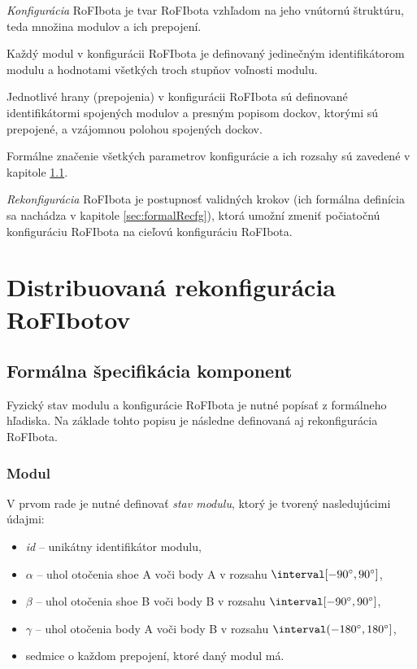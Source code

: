 \documentclass[
  digital, %
  oneside, %
  table,   %
  lof,     %
  nolot,     %
]{fithesis3}
\begin{document}
\textit{Konfigurácia} RoFIbota je tvar RoFIbota vzhľadom na jeho vnútornú štruktúru, teda množina modulov a ich prepojení. 

Každý modul v konfigurácii RoFIbota je definovaný jedinečným identifikátorom modulu a hodnotami všetkých troch stupňov voľnosti modulu. 

Jednotlivé hrany (prepojenia) v konfigurácii RoFIbota sú definované identifikátormi spojených modulov a presným popisom dockov, ktorými sú prepojené, a vzájomnou polohou spojených dockov. 

Formálne značenie všetkých parametrov konfigurácie a ich rozsahy sú zavedené v kapitole \ref{sec:formalSpec}. 

\textit{Rekonfigurácia} RoFIbota je postupnosť validných krokov (ich formálna definícia sa nachádza v kapitole \ref{sec:formalRecfg}), ktorá umožní zmeniť počiatočnú konfiguráciu RoFIbota na cieľovú konfiguráciu RoFIbota. 






\chapter{Distribuovaná rekonfigurácia RoFIbotov}
\section{Formálna špecifikácia komponent}
\label{sec:formalSpec}
Fyzický stav modulu a konfigurácie RoFIbota je nutné popísať z formálneho hľadiska. Na základe tohto popisu je následne definovaná aj rekonfigurácia RoFIbota. 

\subsection{Modul}
\label{sec:formalSpecModul}
V prvom rade je nutné definovať \textit{stav modulu}, ktorý je tvorený nasledujúcimi údajmi: 
\begin{itemize}
    \item \textit{id} -- unikátny identifikátor modulu, 
    \item $\alpha$ -- uhol otočenia shoe A voči body A v rozsahu $\interval[{-90\degree, 90\degree}]$,
    \item $\beta$ -- uhol otočenia shoe B voči body B v rozsahu $\interval[{-90\degree, 90\degree}]$,
    \item $\gamma$ -- uhol otočenia body A voči body B v rozsahu $\interval({-180\degree, 180\degree}]$,
    \item sedmice o každom prepojení, ktoré daný modul má. 
\end{itemize} 
\end{document}
